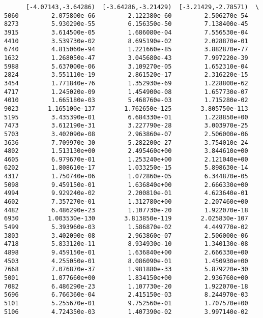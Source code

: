 \documentclass[11pt]{article}
\begin{document}
\begin{verbatim}
      [-4.07143,-3.64286)  [-3.64286,-3.21429)  [-3.21429,-2.78571)  \
5060         2.075800e-66         2.122380e-60         2.506270e-54   
8273         5.930290e-55         6.156350e-50         7.138400e-45   
3915         3.614500e-05         1.686080e-04         7.556530e-04   
4410         3.539730e-02         8.695190e-02         2.028870e-01   
6740         4.815060e-94         1.221660e-85         3.882870e-77   
1632         1.268050e-47         3.045680e-43         7.997220e-39   
5988         5.637000e-06         3.109270e-05         1.652310e-04   
2824         3.551110e-19         2.861520e-17         2.316220e-15   
3454         1.771840e-76         1.352930e-69         1.228800e-62   
4717         1.245020e-09         1.454900e-08         1.657730e-07   
4010         1.665180e-03         5.468760e-03         1.715280e-02   
9023        1.165100e-137        1.762650e-125        3.805750e-113   
5195         3.435390e-01         6.684330e-01         1.228850e+00   
7473         3.612190e-31         3.227790e-28         3.003970e-25   
5703         3.402090e-08         2.963860e-07         2.506000e-06   
3636         7.709970e-30         5.282200e-27         3.754010e-24   
4802         1.513130e+00         2.495460e+00         3.844610e+00   
4605         6.979670e-01         1.253240e+00         2.121040e+00   
6202         1.808610e-17         1.033250e-15         5.898630e-14   
4317         1.750740e-06         1.072860e-05         6.344870e-05   
5098         9.459150e-01         1.636840e+00         2.666330e+00   
4994         9.929240e-02         2.200810e-01         4.623640e-01   
4602         7.357270e-01         1.312780e+00         2.207460e+00   
4482         6.486290e-23         1.107730e-20         1.922070e-18   
6930        1.003530e-130        3.813850e-119        2.025830e-107   
5499         5.393960e-03         1.586870e-02         4.449770e-02   
3803         3.402090e-08         2.963860e-07         2.506000e-06   
4718         5.833120e-11         8.934930e-10         1.340130e-08   
4898         9.459150e-01         1.636840e+00         2.666330e+00   
4503         4.255050e-01         8.086090e-01         1.450930e+00   
7668         7.076870e-37         1.981880e-33         5.879220e-30   
5001         1.077660e+00         1.834150e+00         2.936760e+00   
7082         6.486290e-23         1.107730e-20         1.922070e-18   
5696         6.766360e-04         2.415150e-03         8.244970e-03   
5101         5.255670e-01         9.752560e-01         1.707570e+00   
5106         4.724350e-03         1.407390e-02         3.997140e-02   

\end{verbatim}
\end{document}

